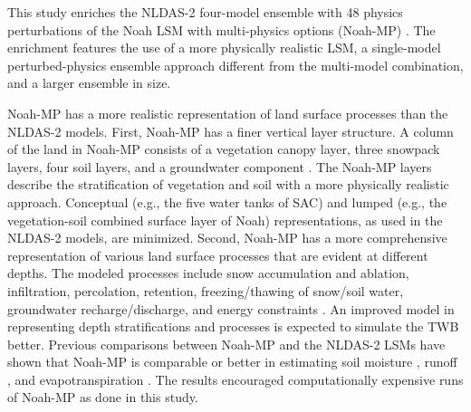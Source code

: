 \documentclass[essd]{copernicus}
\begin{document}
This study enriches the NLDAS-2 four-model ensemble with 48 physics perturbations of the Noah LSM with multi-physics options (Noah-MP) \citep{niu2011JGRA, yang2011JGRA}. The enrichment features the use of a more physically realistic LSM, a single-model perturbed-physics ensemble approach different from the multi-model combination, and a larger ensemble in size.

Noah-MP has a more realistic representation of land surface processes than the NLDAS-2 models. First, Noah-MP has a finer vertical layer structure. A column of the land in Noah-MP consists of a vegetation canopy layer, three snowpack layers, four soil layers, and a groundwater component \citep{niu2011JGRA}. The Noah-MP layers describe the stratification of vegetation and soil with a more physically realistic approach. Conceptual (e.g., the five water tanks of SAC) and lumped (e.g., the vegetation-soil combined surface layer of Noah) representations, as used in the NLDAS-2 models, are minimized. Second, Noah-MP has a more comprehensive representation of various land surface processes that are evident at different depths. The modeled processes include snow accumulation and ablation, infiltration, percolation, retention, freezing/thawing of snow/soil water, groundwater recharge/discharge, and energy constraints \citep{niu2011JGRA}. An improved model in representing depth stratifications and processes is expected to simulate the TWB better. Previous comparisons between Noah-MP and the NLDAS-2 LSMs have shown that Noah-MP is comparable or better in estimating soil moisture \citep{cai2014JGRAa}, runoff \citep{fei2021WRR, cai2014JGRAa}, and evapotranspiration \citep{zhang2020AFM}. The results encouraged computationally expensive runs of Noah-MP as done in this study.
\end{document}

